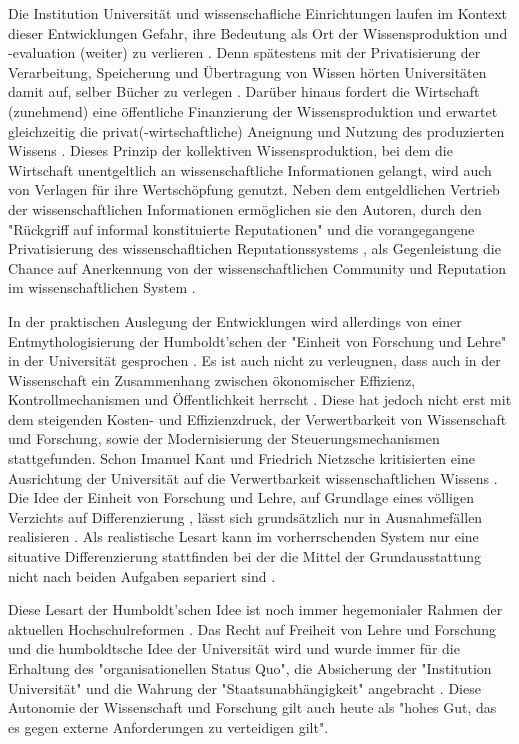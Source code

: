 Die Institution Universität und wissenschafliche Einrichtungen laufen im Kontext dieser Entwicklungen Gefahr, ihre Bedeutung als Ort der Wissensproduktion und -evaluation (weiter) zu verlieren \cite[:343]{Kruecken_2001}. Denn spätestens mit der Privatisierung der Verarbeitung, Speicherung und Übertragung von Wissen hörten Universitäten damit auf, selber Bücher zu verlegen \cite{cite:0}. Darüber hinaus fordert die Wirtschaft (zunehmend) eine öffentliche Finanzierung der Wissensproduktion und erwartet gleichzeitig die privat(-wirtschaftliche) Aneignung und Nutzung des produzierten Wissens \cite{cite:2}. Dieses Prinzip der kollektiven Wissensproduktion, bei dem die Wirtschaft unentgeltlich an wissenschaftliche Informationen gelangt, wird auch von Verlagen für ihre Wertschöpfung genutzt. Neben dem entgeldlichen Vertrieb der wissenschaftlichen Informationen ermöglichen sie den Autoren, durch den "Rückgriff auf informal konstituierte Reputationen" \cite{luhmann_1970_selbststeuerung} und die vorangegangene Privatisierung des wissenschafltichen Reputationssystems \cite{suchen}, als Gegenleistung die Chance auf Anerkennung von der wissenschaftlichen Community und Reputation im wissenschaftlichen System \cite{cite:21a}.

In der praktischen Auslegung der Entwicklungen wird allerdings von einer Entmythologisierung der Humboldt’schen der "Einheit von Forschung und Lehre" in der Universität gesprochen \cite{binswanger_2014_excellence} \cite[:299]{Schimank_2001} \cite[:343]{Kruecken_2001}. Es ist auch nicht zu verleugnen, dass auch in der Wissenschaft ein Zusammenhang zwischen ökonomischer Effizienz, Kontrollmechanismen und Öffentlichkeit herrscht \cite[:27]{Reinhart_intransparenz_2006} \cite{foucault_1977_uberwachen}. Diese hat jedoch nicht erst mit dem steigenden Kosten- und Effizienzdruck, der Verwertbarkeit von Wissenschaft und Forschung, sowie der Modernisierung der Steuerungsmechanismen stattgefunden. Schon Imanuel Kant und Friedrich Nietzsche kritisierten eine Ausrichtung der Universität auf die Verwertbarkeit wissenschaftlichen Wissens \cite{Huber_2005}. Die Idee der Einheit von Forschung und Lehre, auf Grundlage eines völligen Verzichts auf Differenzierung \cite{kittler_2004}, lässt sich grundsätzlich nur in Ausnahmefällen realisieren \cite{Schimank_2001}. Als realistische Lesart kann im vorherrschenden System nur eine situative Differenzierung stattfinden bei der die Mittel der Grundausstattung nicht nach beiden Aufgaben separiert sind \cite{Schimank_2001}.

Diese Lesart der Humboldt’schen Idee ist noch immer hegemonialer Rahmen der aktuellen Hochschulreformen \cite{Huber_2005}. Das Recht auf Freiheit von Lehre und Forschung und die humboldtsche Idee der Universität wird und wurde immer für die Erhaltung des "organisationellen Status Quo", die Absicherung der "Institution Universität" und die Wahrung der "Staatsunabhängigkeit" angebracht \cite{Huber_2005}. Diese Autonomie der Wissenschaft und Forschung gilt auch heute als "hohes Gut, das es gegen externe Anforderungen zu verteidigen gilt"\cite{kaldewey_2010}.

